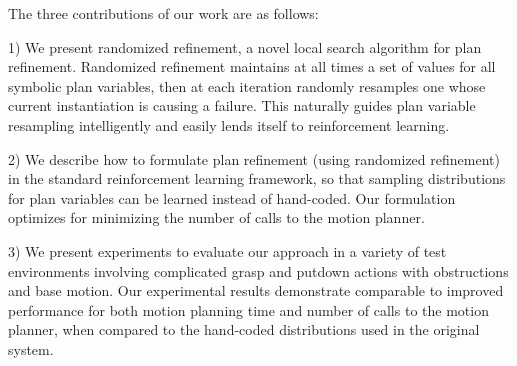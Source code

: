 The three contributions of our work are as follows:
\begin{tightlist}
\item[1)] We present randomized refinement,
a novel local search algorithm for plan refinement. Randomized refinement maintains at
all times a set of values for all symbolic plan variables, then at each iteration randomly
resamples one whose current instantiation is causing a failure. This naturally guides
plan variable resampling intelligently and easily lends itself to reinforcement learning.
\item[2)] We describe how to formulate plan refinement (using randomized
refinement) in the standard reinforcement learning framework, so that sampling
distributions for plan variables can be learned instead of hand-coded. Our formulation optimizes for
minimizing the number of calls to the motion planner.
\item[3)] We present experiments to evaluate our approach
in a variety of test environments involving complicated grasp and putdown
actions with obstructions and base motion. Our experimental results demonstrate
comparable to improved performance for both motion planning time and number of calls to
the motion planner, when compared to the hand-coded distributions used in the original system.
\end{tightlist}